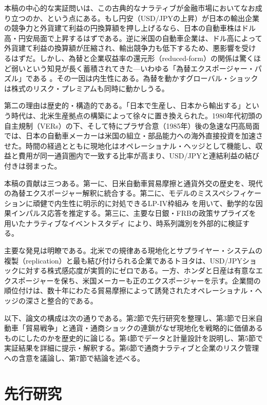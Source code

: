 \documentclass[12pt,a4paper]{article}
\begin{document}
本稿の中心的な実証問いは、この古典的なナラティブが金融市場においてなお成り立つのか、という点にある。もし円安（USD/JPYの上昇）が日本の輸出企業の競争力と外貨建て利益の円換算額を押し上げるなら、日本の自動車株はドル高・円安局面で上昇するはずである。逆に米国の自動車企業は、ドル高によって外貨建て利益の換算額が圧縮され、輸出競争力も低下するため、悪影響を受けるはずだ。しかし、為替と企業収益率の還元形（reduced-form）の関係は驚くほど弱いという知見が長く蓄積されてきた---いわゆる「為替エクスポージャー・パズル」である \citep{bartram2010}。その一因は内生性にある。為替を動かすグローバル・ショックは株式のリスク・プレミアムも同時に動かしうる。

第二の理由は歴史的・構造的である。「日本で生産し、日本から輸出する」という時代は、北米生産拠点の構築によって徐々に置き換えられた。1980年代初頭の自主規制（VERs）の下、そして特にプラザ合意（1985年）後の急速な円高局面では、日本の自動車メーカーは米国の組立・部品能力への海外直接投資を加速させた。時間の経過とともに現地化はオペレーショナル・ヘッジとして機能し、収益と費用が同一通貨圏内で一致する比率が高まり、USD/JPYと連結利益の結び付きは弱まった。

本稿の貢献は三つある。第一に、日米自動車貿易摩擦と通貨外交の歴史を、現代の為替エクスポージャー解釈に統合する。第二に、モデルのミススペシフィケーションに頑健で内生性に明示的に対処できるLP-IV枠組み \citep{jorda2005} を用いて、動学的な因果インパルス応答を推定する。第三に、主要な日銀・FRBの政策サプライズを用いたナラティブなイベントスタディ \citep{mackinlay1997} により、時系列識別を外部的に検証する。

主要な発見は明瞭である。北米での規律ある現地化とサプライヤー・システムの複製（replication）と最も結び付けられる企業であるトヨタは、USD/JPYショックに対する株式感応度が実質的にゼロである。一方、ホンダと日産は有意なエクスポージャーを保ち、米国メーカーも正のエクスポージャーを示す。企業間の順位付けは、数十年にわたる貿易摩擦によって誘発されたオペレーショナル・ヘッジの深さと整合的である。

以下、論文の構成は次の通りである。第2節で先行研究を整理し、第3節で日米自動車「貿易戦争」と通貨・通商ショックの連鎖がなぜ現地化を戦略的に価値あるものにしたのかを歴史的に論じる。第4節でデータと計量設計を説明し、第5節で実証結果を詳細に提示・解釈する。第6節で通商ナラティブと企業のリスク管理への含意を議論し、第7節で結論を述べる。

\section{先行研究}
\end{document}
